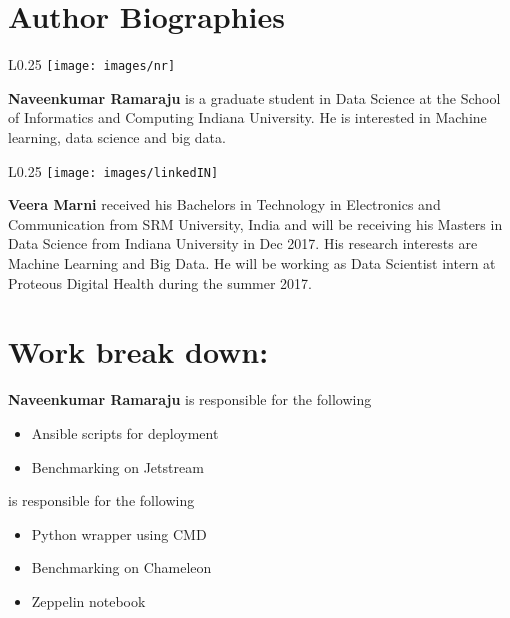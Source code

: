 \documentclass[9pt,twocolumn,twoside]{../../styles/osajnl}
\begin{document}
	\section*{Author Biographies}
	\begingroup
	\setlength\intextsep{0pt}
	\begin{minipage}[t][3.2cm][t]{1.0\columnwidth} %
		\begin{wrapfigure}{L}{0.25\columnwidth}
			\texttt{[image: images/nr]}
		\end{wrapfigure}
		\noindent
		{\bfseries Naveenkumar Ramaraju} is a graduate student  in 
		Data Science at the School of Informatics and Computing 
		Indiana University. He is interested in
		Machine learning, data science and big data.
		\end{minipage}
	\begin{minipage}[t][3.2cm][t]{1.0\columnwidth} %
		\begin{wrapfigure}{L}{0.25\columnwidth}
			\texttt{[image: images/linkedIN]}
		\end{wrapfigure}
		\noindent
		{\bfseries Veera Marni} received his Bachelors in Technology 
		in Electronics and Communication from SRM University, India 
		and will be receiving his Masters in Data Science from 
		Indiana University in Dec 2017. His research interests are 
		Machine Learning and Big Data. He will be working as Data 
		Scientist intern at Proteous Digital Health during the summer 
		2017.
	\end{minipage}
	
	\endgroup
	
	\section{Work break down:}
	
	{\bfseries Naveenkumar Ramaraju} is responsible for the following 
	\begin{itemize}
		\item Ansible scripts for deployment
		\item Benchmarking on Jetstream
	\end{itemize}
	
	\hspace{-3ex}{\bfseries Veera Marni} is responsible for the 
	following
	\begin{itemize}
		\item Python wrapper using CMD
		\item Benchmarking on Chameleon
		\item Zeppelin notebook
	\end{itemize}
	
	
	
		
	
	\newpage
	
\end{document}
